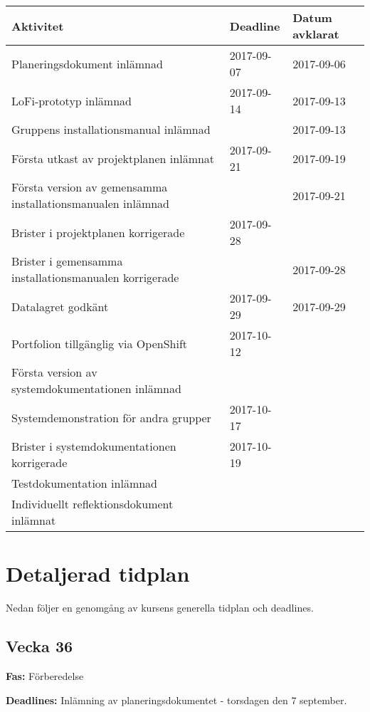 \documentclass{TDP003mall}
\begin{document}
\begin{table}[H]
\renewcommand{\arraystretch}{1.5}
\begin{tabularx}{\linewidth}{|l|X|l|}
\hline
\textbf{Aktivitet} & \textbf{Deadline} & \textbf{Datum avklarat}\\
\hline
Planeringsdokument inlämnad & 2017-09-07 & 2017-09-06\\
\hline
 LoFi-prototyp inlämnad & 2017-09-14 & 2017-09-13\\
Gruppens installationsmanual inlämnad & & 2017-09-13\\
\hline
Första utkast av projektplanen inlämnat & 2017-09-21 & 2017-09-19\\
Första version av gemensamma installationsmanualen inlämnad & & 2017-09-21\\
\hline
 Brister i projektplanen korrigerade & 2017-09-28 &\\
Brister i gemensamma installationsmanualen korrigerade && 2017-09-28 \\
\hline
 Datalagret godkänt & 2017-09-29 & 2017-09-29\\
\hline
Portfolion tillgänglig via OpenShift & 2017-10-12 &\\
Första version av systemdokumentationen inlämnad & & \\
\hline
 Systemdemonstration för andra grupper & 2017-10-17 &\\
\hline
 Brister i systemdokumentationen korrigerade & 2017-10-19 &\\
Testdokumentation inlämnad & &\\
Individuellt reflektionsdokument inlämnat & &\\
\hline

\end{tabularx}
\end{table}

\pagebreak
\section{Detaljerad tidplan}
Nedan följer en genomgång av kursens generella tidplan och deadlines.

\subsection{Vecka 36}

\textbf{Fas:} Förberedelse

\textbf{Deadlines:} Inlämning av planeringsdokumentet - torsdagen den 7 september.
\end{document}
